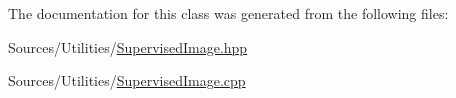 The documentation for this class was generated from the following files\+:\begin{DoxyCompactItemize}
\item 
Sources/\+Utilities/\hyperlink{_supervised_image_8hpp}{Supervised\+Image.\+hpp}\item 
Sources/\+Utilities/\hyperlink{_supervised_image_8cpp}{Supervised\+Image.\+cpp}\end{DoxyCompactItemize}

